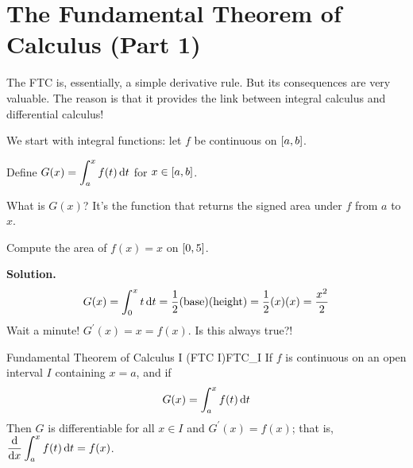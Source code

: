 \section{The Fundamental Theorem of Calculus (Part 1)}
The FTC is, essentially, a simple derivative rule. But
its consequences are very valuable. The reason is that it
provides the link between integral calculus and
differential calculus!

We start with integral functions: let $ f $ be
continuous on $ \interval{a}{b} $.

Define
$ \displaystyle G(x)=\int_{a}^{x} f(t)\odif{t} $
for $ x\in\interval{a}{b} $.

What is $ G(x) $? It's the function that returns the signed
area under $ f $ from $ a $ to $ x $.

\begin{Example}{}{}
    Compute the area of $ f(x)=x $ on $ \interval{0}{5} $.

    \textbf{Solution.}
    \[
        G(x)
        =\int_{0}^{x} t\odif{t}
        =\frac{1}{2}(\text{base})(\text{height})
        =\frac{1}{2}(x)(x)
        =\frac{x^2}{2}
    \]
    Wait a minute! $ G^\prime(x)=x=f(x) $. Is this always true?!
\end{Example}

\begin{Theorem}{Fundamental Theorem of Calculus I (FTC I)}{FTC_I}
    If $ f $ is continuous on an open interval $ I $ containing
    $ x=a $, and if
    \[ G(x)=\int_{a}^{x} f(t)\odif{t}  \]
    Then $ G $ is differentiable for all $ x\in I $ and
    $ G^\prime(x)=f(x) $; that is,
    $ \displaystyle \odv{}{x}\int_{a}^{x} f(t)\odif{t}=f(x) $.
\end{Theorem}

